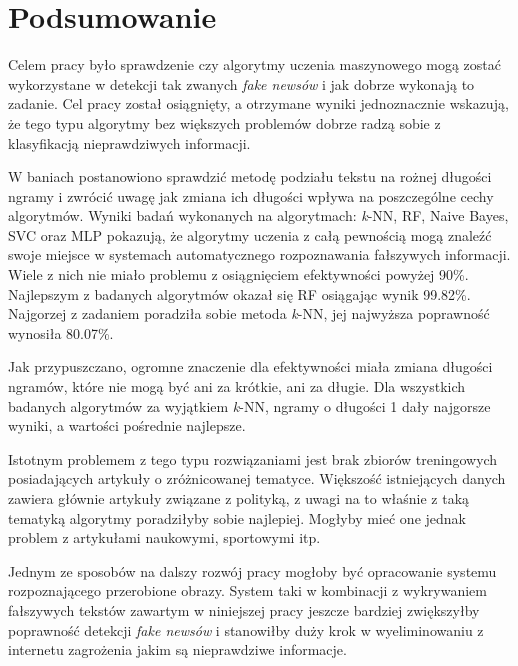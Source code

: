 \chapter{Podsumowanie}
Celem pracy było sprawdzenie czy algorytmy uczenia maszynowego mogą zostać wykorzystane
w detekcji tak zwanych \textit{fake newsów} i jak dobrze wykonają to zadanie. Cel pracy został osiągnięty,
a otrzymane wyniki jednoznacznie wskazują, że tego typu algorytmy bez większych problemów dobrze 
radzą sobie z klasyfikacją nieprawdziwych informacji.


W baniach postanowiono sprawdzić metodę podziału tekstu na rożnej długości ngramy i zwrócić uwagę 
jak zmiana ich długości wpływa na poszczególne cechy algorytmów.
Wyniki badań wykonanych na algorytmach: \textit{k}-NN, RF, Naive Bayes,
SVC oraz MLP pokazują, że algorytmy uczenia z całą pewnością mogą znaleźć swoje miejsce w systemach
automatycznego rozpoznawania fałszywych informacji. Wiele z nich nie miało problemu z osiągnięciem 
efektywności powyżej 90\%. Najlepszym z badanych algorytmów okazał się RF osiągając
wynik 99.82\%. Najgorzej z zadaniem poradziła sobie metoda \textit{k}-NN, jej najwyższa 
poprawność wynosiła 80.07\%.

Jak przypuszczano, ogromne znaczenie dla efektywności
miała zmiana długości ngramów, które nie mogą być ani za krótkie, ani za długie.
Dla wszystkich badanych algorytmów za wyjątkiem \textit{k}-NN, ngramy o długości 1 dały najgorsze wyniki, a wartości
pośrednie najlepsze.

Istotnym problemem z tego typu rozwiązaniami jest brak zbiorów treningowych posiadających 
artykuły o zróżnicowanej tematyce. Większość istniejących danych zawiera głównie artykuły związane z 
polityką, z uwagi na to właśnie z taką tematyką algorytmy poradziłyby sobie najlepiej. Mogłyby mieć one jednak problem 
z artykułami naukowymi, sportowymi itp.

Jednym ze sposobów na dalszy rozwój pracy mogłoby być opracowanie systemu rozpoznającego 
przerobione obrazy. System taki w kombinacji z wykrywaniem fałszywych tekstów zawartym
w niniejszej pracy jeszcze bardziej zwiększyłby poprawność detekcji \textit{fake newsów} i stanowiłby 
duży krok w wyeliminowaniu z internetu zagrożenia jakim są nieprawdziwe informacje.